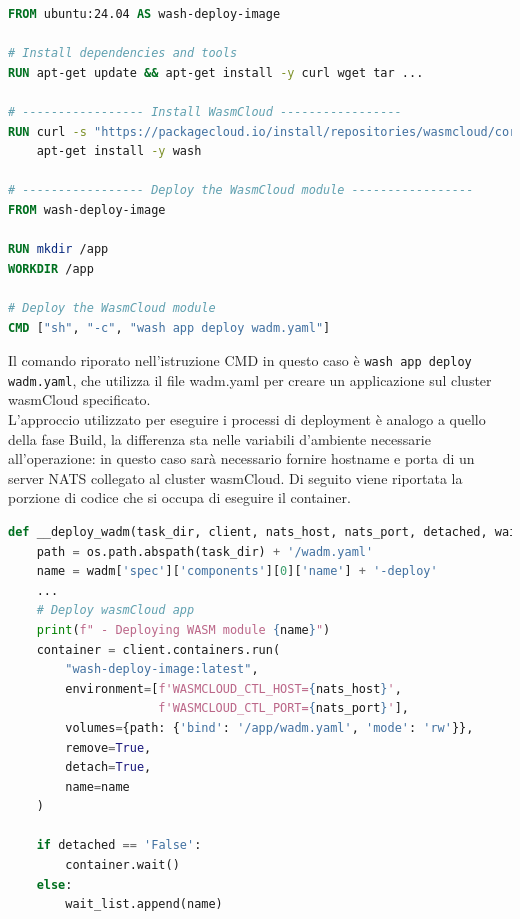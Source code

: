 \begin{lstlisting}[language=Dockerfile, caption={wash-build-image Dockerfile}, captionpos=b, label={code:wash_buil_image_dockerfile}, basicstyle=\ttfamily\small]
FROM ubuntu:24.04 AS wash-deploy-image

# Install dependencies and tools
RUN apt-get update && apt-get install -y curl wget tar ...

# ----------------- Install WasmCloud -----------------
RUN curl -s "https://packagecloud.io/install/repositories/wasmcloud/core/script.deb.sh" | bash && \
    apt-get install -y wash

# ----------------- Deploy the WasmCloud module -----------------
FROM wash-deploy-image

RUN mkdir /app
WORKDIR /app

# Deploy the WasmCloud module
CMD ["sh", "-c", "wash app deploy wadm.yaml"]
\end{lstlisting}

Il comando riporato nell'istruzione CMD in questo caso è \texttt{wash app deploy wadm.yaml}, che utilizza il file wadm.yaml per creare un applicazione sul cluster wasmCloud specificato.\\
L'approccio utilizzato per eseguire i processi di deployment è analogo a quello della fase Build, la differenza sta nelle variabili d'ambiente necessarie all'operazione: in questo caso sarà necessario fornire hostname e porta di un server NATS collegato al cluster wasmCloud. Di seguito viene riportata la porzione di codice che si occupa di eseguire il container.\\

\begin{lstlisting}[language=python, caption={Deploy applicazione su wasmCloud}, captionpos=b, label={code:deploy}]
def __deploy_wadm(task_dir, client, nats_host, nats_port, detached, wait_list):
    path = os.path.abspath(task_dir) + '/wadm.yaml'
    name = wadm['spec']['components'][0]['name'] + '-deploy'
    ...
    # Deploy wasmCloud app
    print(f" - Deploying WASM module {name}")
    container = client.containers.run(
        "wash-deploy-image:latest",
        environment=[f'WASMCLOUD_CTL_HOST={nats_host}',
                     f'WASMCLOUD_CTL_PORT={nats_port}'],
        volumes={path: {'bind': '/app/wadm.yaml', 'mode': 'rw'}},
        remove=True,
        detach=True,
        name=name
    )
    
    if detached == 'False':
        container.wait()
    else:
        wait_list.append(name)
\end{lstlisting}

